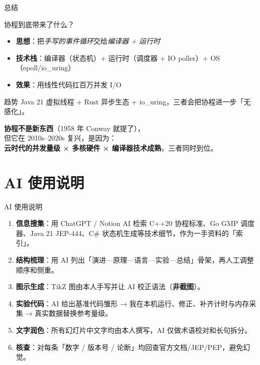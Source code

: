 \documentclass[aspectratio=169, 10pt]{beamer}
\begin{document}
\begin{frame}{总结}
  \begin{block}{协程到底带来了什么？}
    \begin{itemize}
      \item \textbf{思想}：把\textit{手写的事件循环}交给\textit{编译器 + 运行时}
      \item \textbf{技术栈}：编译器（状态机）+ 运行时（调度器 + IO poller）+ OS（epoll/io\_uring）
      \item \textbf{效果}：用线性代码扛百万并发 I/O
    \end{itemize}
  \end{block}

  \begin{exampleblock}{趋势}
    Java 21 虚拟线程 + Rust 异步生态 + io\_uring，三者会把协程进一步「无感化」。
  \end{exampleblock}

  \begin{center}
    \large
    \textbf{协程不是新东西}（1958 年 Conway 就提了），\\
    但它在 2010s--2020s 复兴，是因为：\\
    \textcolor{blue!70}{\textbf{云时代的并发量级 × 多核硬件 × 编译器技术成熟}}，三者同时到位。
  \end{center}
\end{frame}

\section{AI 使用说明}

\begin{frame}{AI 使用说明}
  \begin{enumerate}
    \item \textbf{信息搜集}：用 ChatGPT / Notion AI 检索 C++20 协程标准、Go GMP 调度器、Java 21 JEP-444、C\# 状态机生成等技术细节，作为一手资料的「索引」。
    \item \textbf{结构梳理}：用 AI 列出「演进—原理—语言—实验—总结」骨架，再人工调整顺序和侧重。
    \item \textbf{图示生成}：TikZ 图由本人手写并让 AI 校正语法（\textbf{非截图}）。
    \item \textbf{实验代码}：AI 给出基准代码雏形 → 我在本机运行、修正、补齐计时与内存采集 → 真实数据替换参考量级。
    \item \textbf{文字润色}：所有幻灯片中文字均由本人撰写，AI 仅做术语校对和长句拆分。
    \item \textbf{核查}：对每条「数字 / 版本号 / 论断」均回查官方文档/JEP/PEP，避免幻觉。
  \end{enumerate}
\end{frame}
\end{document}
